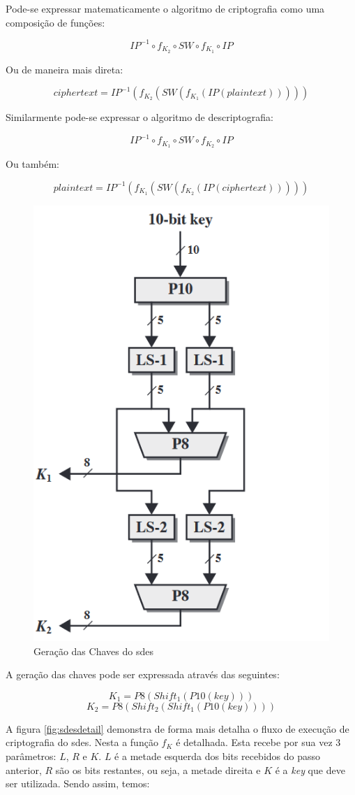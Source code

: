 Pode-se expressar matematicamente o algoritmo de criptografia como uma composição de funções:

\[IP^{-1} \circ f_{K_2} \circ SW \circ f_{K_1} \circ IP\]

Ou de maneira mais direta:

\[ciphertext = IP^{-1}(f_{K_2}(SW(f_{K_1}(IP(plaintext)))))\]

Similarmente pode-se expressar o algoritmo de descriptografia:

\[IP^{-1} \circ f_{K_1} \circ SW \circ f_{K_2} \circ IP\]

Ou também:

\[plaintext = IP^{-1}(f_{K_1}(SW(f_{K_2}(IP(ciphertext)))))\]

\begin{figure}[H]
    \centering
    \caption{Geração das Chaves do \acrshort{sdes}}
    \includegraphics[width=.5\linewidth]{Figuras/SDESKeysGen.png}
\end{figure}

A geração das chaves pode ser expressada através das seguintes:

\[K_1 = P8(Shift_1(P10(key)))\]
\[K_2 = P8(Shift_2(Shift_1(P10(key))))\]

A figura \ref{fig:sdesdetail} demonstra de forma mais detalha o fluxo de execução de criptografia do \acrshort{sdes}. Nesta a função \(f_K\) é detalhada. Esta recebe por sua vez 3 parâmetros: \(L\), \(R\) e \(K\). \(L\) é a metade esquerda dos bits recebidos do passo anterior, \(R\) são os bits restantes, ou seja, a metade direita e \(K\) é a \textit{key} que deve ser utilizada. Sendo assim, temos:

